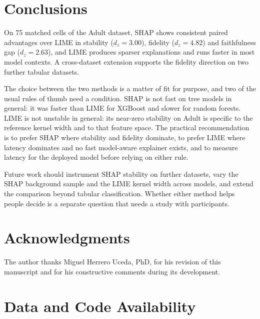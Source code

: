 \documentclass{cleiej}
\newif\ifblind
\begin{document}
\section{Conclusions}
\label{sec:conclusion}

On 75 matched cells of the Adult dataset, SHAP shows consistent paired
advantages over LIME in stability ($d_z = 3.00$), fidelity ($d_z = 4.82$)
and faithfulness gap ($d_z = 2.63$), and LIME produces sparser explanations
and runs faster in most model contexts. A cross-dataset extension supports
the fidelity direction on two further tabular datasets.

The choice between the two methods is a matter of fit for purpose, and two
of the usual rules of thumb need a condition. SHAP is not fast on tree
models in general: it was faster than LIME for XGBoost and slower for
random forests. LIME is not unstable in general: its near-zero stability on
Adult is specific to the reference kernel width and to that feature space.
The practical recommendation is to prefer SHAP where stability and fidelity
dominate, to prefer LIME where latency dominates and no fast model-aware
explainer exists, and to measure latency for the deployed model before
relying on either rule.

Future work should instrument SHAP stability on further datasets, vary the
SHAP background sample and the LIME kernel width across models, and extend
the comparison beyond tabular classification. Whether either method helps
people decide is a separate question that needs a study with participants.

\ifblind\else
\section*{Acknowledgments}

The author thanks Miguel Herrero Uceda, PhD, for his revision of this
manuscript and for his constructive comments during its development.
\fi

\section*{Data and Code Availability}
\label{sec:artifacts}
\end{document}
